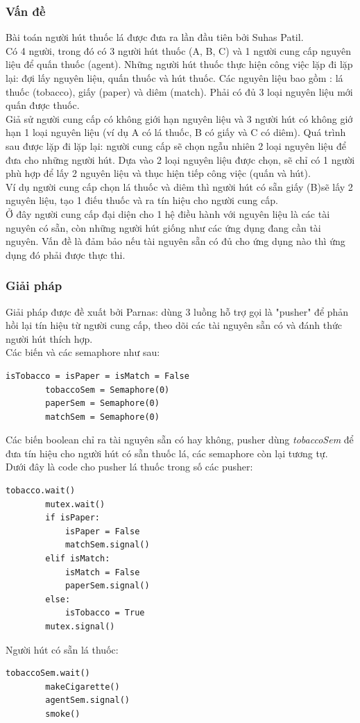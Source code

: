 \documentclass[12pt]{article}
\begin{document}
		\subsubsection{Vấn đề}
		Bài toán người hút thuốc lá được đưa ra lần đầu tiên bởi Suhas Patil. \\
		Có 4 người, trong đó có 3 người hút thuốc (A, B, C) và 1 người cung cấp nguyên liệu để quấn thuốc (agent). Những người hút thuốc thực hiện công việc lặp đi lặp lại: đợi lấy nguyên liệu, quấn thuốc và hút thuốc. Các nguyên liệu bao gồm : lá thuốc (tobacco), giấy (paper) và diêm (match). Phải có đủ 3 loại nguyên liệu mới quấn được thuốc.\\
		Giả sử người cung cấp có không giới hạn nguyên liệu và 3 người hút có không giớ hạn 1 loại nguyên liệu (ví dụ A có lá thuốc, B có giấy và C có diêm). Quá trình sau được lặp đi lặp lại: người cung cấp sẽ chọn ngẫu nhiên 2 loại nguyên liệu để đưa cho những người hút. Dựa vào 2 loại nguyên liệu được chọn, sẽ chỉ có 1 người phù hợp để lấy 2 nguyên liệu và thục hiện tiếp công việc (quấn và hút).\\
		Ví dụ người cung cấp chọn lá thuốc và diêm thì người hút có sẵn giấy (B)sẽ lấy 2 nguyên liệu, tạo 1 điếu thuốc và ra tín hiệu cho người cung cấp.\\
		Ở đây người cung cấp đại diện cho 1 hệ điều hành với nguyên liệu là các tài nguyên có sẵn, còn những người hút giống như các ứng dụng đang cần tài nguyên. Vấn đề là đảm bảo nếu tài nguyên sẵn có đủ cho ứng dụng nào thì ứng dụng đó phải được thực thi. 
		\subsubsection{Giải pháp}
		Giải pháp được đề xuất bởi Parnas: dùng 3 luồng hỗ trợ gọi là "pusher" để phản hồi lại tín hiệu từ người cung cấp, theo dõi các tài nguyên sẵn có và đánh thức người hút thích hợp.\\
		Các biến và các semaphore như sau:
     	\begin{lstlisting}[style = Python]
    	isTobacco = isPaper = isMatch = False 
    	tobaccoSem = Semaphore(0) 
    	paperSem = Semaphore(0) 
    	matchSem = Semaphore(0)
    	\end{lstlisting}
    	Các biến boolean chỉ ra tài nguyên sẵn có hay không, pusher dùng \textit{tobaccoSem} để đưa tín hiệu  cho người hút có sẵn thuốc lá, các semaphore còn lại tương tự.\\
\newpage
    	Dưới đây là code cho pusher lá thuốc trong số các pusher:
    	\begin{lstlisting}[style = Python]
    	tobacco.wait() 
    	mutex.wait() 
    	if isPaper: 
    		isPaper = False 
    		matchSem.signal() 
    	elif isMatch: 
    		isMatch = False 
    		paperSem.signal() 
    	else: 
    		isTobacco = True 
    	mutex.signal()
    	\end{lstlisting}
    	Người hút có sẵn lá thuốc:
    	\begin{lstlisting}[style = Python]
    	tobaccoSem.wait() 
    	makeCigarette() 
    	agentSem.signal() 
    	smoke()
    	\end{lstlisting}
\bigskip
\end{document}
